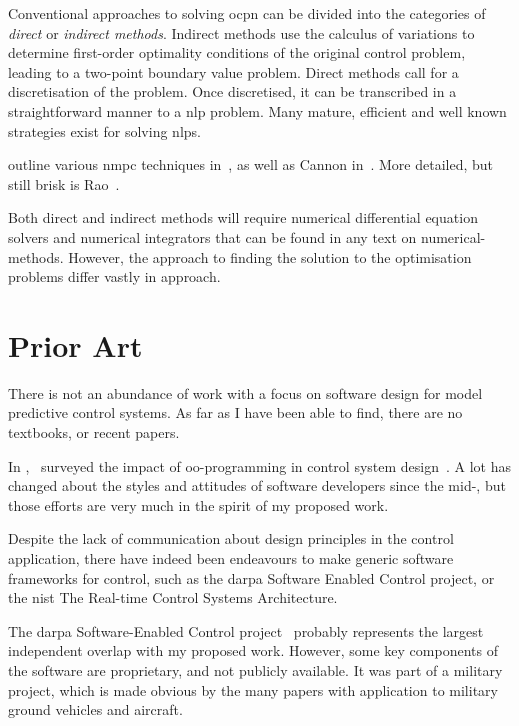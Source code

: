 Conventional approaches to solving \ac{ocpn} can be divided into the categories
of \emph{direct} or \emph{indirect methods}. Indirect methods use the calculus
of variations to determine first-order optimality conditions of the original
control problem, leading to a two-point boundary value problem. Direct methods
call for a discretisation of the problem. Once discretised, it can be
transcribed in a straightforward manner to a \ac{nlp} problem. Many mature,
efficient and well known strategies exist for solving \acp{nlp}.

\citeauthor{Findeisen2002} outline various \ac{nmpc} techniques
in~\cite{Findeisen2002}, as well as Cannon in~\cite{Cannon2004}. More detailed,
but still brisk is Rao~\cite{rao2009survey}.

Both direct and indirect methods will require numerical differential equation
solvers and numerical integrators that can be found in any text on
numerical-methods. However, the approach to finding the solution to the
optimisation problems differ vastly in approach.



\section{Prior Art}%
\label{sec:prior-art}


There is not an abundance of work with a focus on software design for model
predictive control systems. As far as I have been able to find, there are no
textbooks, or recent papers.

In ,\ \citeauthor{Jobling1994} surveyed the impact
of \ac{oo}-programming in control system design~\cite{Jobling1994}. A lot has
changed about the styles and attitudes of software developers since the
mid-, but those efforts are very much in the spirit of my proposed
work.

Despite the lack of communication about design principles in the control
application, there have indeed been endeavours to make generic software
frameworks for control, such as the \ac{darpa} Software Enabled Control
project, or the \ac{nist}
The Real-time Control Systems Architecture.

The \ac{darpa} Software-Enabled Control project~\cite{Keviczky2004,Gill2003}
probably represents the largest independent overlap with my proposed work.
However, some key components of the software are proprietary, and not publicly
available. It was part of a military project, which is made obvious by the many
papers with application to military ground vehicles and aircraft.


